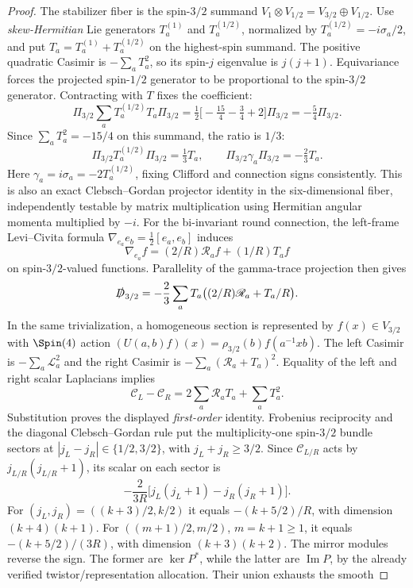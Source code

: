\documentclass[11pt,a4paper]{article}
\begin{document}
\begin{proof}
The stabilizer fiber is the spin-\(3/2\) summand
\(V_1\otimes V_{1/2}=V_{3/2}\oplus V_{1/2}\). Use
\emph{skew-Hermitian} Lie generators \(T_a^{(1)}\) and
\(T_a^{(1/2)}\), normalized by
\(T_a^{(1/2)}=-i\sigma_a/2\), and put
\(T_a=T_a^{(1)}+T_a^{(1/2)}\) on the highest-spin summand.
The positive quadratic Casimir is \(-\sum_aT_a^2\), so its
spin-\(j\) eigenvalue is \(j(j+1)\). Equivariance forces the
projected spin-\(1/2\) generator to be proportional to the
spin-\(3/2\) generator. Contracting with \(T\) fixes the coefficient:
\[
 \Pi_{3/2}\sum_aT_a^{(1/2)}T_a\Pi_{3/2}
 =\tfrac12\bigl[-\tfrac{15}{4}-\tfrac34+2\bigr]\Pi_{3/2}
 =-\tfrac54\Pi_{3/2}.
\]
Since \(\sum_aT_a^2=-15/4\) on this summand, the ratio is \(1/3\):
\[
 \Pi_{3/2}T_a^{(1/2)}\Pi_{3/2}=\tfrac13T_a,
 \qquad \Pi_{3/2}\gamma_a\Pi_{3/2}=-\tfrac{2}{3}T_a.
\]
Here \(\gamma_a=i\sigma_a=-2T_a^{(1/2)}\), fixing
Clifford and connection signs consistently. This is also an exact
Clebsch--Gordan projector identity in the six-dimensional fiber,
independently testable by matrix multiplication using Hermitian
angular momenta multiplied by \(-i\).
For the bi-invariant round connection, the left-frame Levi--Civita
formula \(\nabla_{e_a}e_b=\tfrac12[e_a,e_b]\) induces
\[
 \nabla_{e_a}f=(2/R)\mathscr R_af+(1/R)T_af
\]
on spin-\(3/2\)-valued functions. Parallelity of the gamma-trace
projection then gives
\[
 \slashed D_{3/2}
 =-\frac23\sum_aT_a\bigl((2/R)\mathscr R_a+T_a/R\bigr).
\]
In the same trivialization, a homogeneous section is represented by
\(f(x)\in V_{3/2}\) with \(\Spin(4)\) action
\((U(a,b)f)(x)=\rho_{3/2}(b)f(a^{-1}xb)\). The left Casimir is
\(-\sum_a\mathscr L_a^2\) and the right Casimir is
\(-\sum_a(\mathscr R_a+T_a)^2\). Equality of the left and right
scalar Laplacians implies
\[
 \mathcal C_L-\mathcal C_R
 =2\sum_a\mathscr R_aT_a+\sum_aT_a^2.
\]
Substitution proves the displayed \emph{first-order} identity.
Frobenius reciprocity and the diagonal Clebsch--Gordan rule put the
multiplicity-one spin-\(3/2\) bundle sectors at
\(\left|j_L-j_R\right|\in\{1/2,3/2\}\), with
\(j_L+j_R\ge3/2\). Since
\(\mathcal C_{L/R}\) acts by \(j_{L/R}(j_{L/R}+1)\),
its scalar on each sector is
\[
 -\frac{2}{3R}\bigl[j_L(j_L+1)-j_R(j_R+1)\bigr].
\]
For \((j_L,j_R)=((k+3)/2,k/2)\) it equals
\(-(k+5/2)/R\), with dimension \((k+4)(k+1)\).
For \(((m+1)/2,m/2)\), \(m=k+1\ge1\), it equals
\(-(k+5/2)/(3R)\), with dimension \((k+3)(k+2)\).
The mirror modules reverse the sign. The former are \(\ker P^*\),
while the latter are \(\operatorname{Im}P\), by the already verified
twistor/representation allocation. Their union exhausts the smooth

\end{proof}
\end{document}
